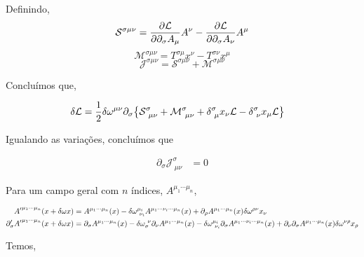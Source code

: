 \documentclass[twoside]{amsart}
\numberwithin{equation}{section}
\begin{document}
Definindo,$$\mathcal S^{\sigma\mu\nu}=\pdv{\mathcal L}{\partial_\sigma A_\mu}A^\nu-\pdv{\mathcal L}{\partial_\sigma A_\nu}A^\mu$$ $$\mathcal M^{\sigma\mu\nu}=T^{\sigma\mu}x^\nu-T^{\sigma\nu}x^\mu$$ $$\mathcal J^{\sigma\mu\nu}=\mathcal S^{\sigma\mu\nu}+\mathcal M^{\sigma\mu\nu}$$

Concluímos que,

\begin{align}
    \delta\mathcal L&=\frac12\delta\omega^{\mu\nu}\partial_\sigma\qty{\mathcal S^{\sigma}_{\ \mu\nu}+\mathcal M^{\sigma}_{\ \mu\nu}+\delta^\sigma_{\ \mu}x_\nu\mathcal L-\delta^\sigma_{\ \nu}x_\mu\mathcal L}
\end{align}

Igualando as variações, concluímos que 

\begin{align}
    \partial_\sigma\mathcal J^{\sigma}_{\ \mu\nu}&=0
\end{align}

Para um campo geral com $n$ índices, $A^{\mu_1\cdots\mu_n}$,

\begin{align}
    {A'}^{\mu_1\cdots\mu_n}\qty(x+\delta \omega x)&=A^{\mu_1\cdots\mu_n}\qty(x)-\delta\omega^{\mu_i}_{\ \nu_i}A^{\mu_1\cdots\nu_i\cdots\mu_n}\qty(x)+\partial_\rho A^{\mu_1\cdots\mu_n}\qty(x)\delta\omega^{\rho \nu}x_\nu\\
    \partial_\sigma'{A'}^{\mu_1\cdots\mu_n}\qty(x+\delta\omega x)&=\partial_\sigma A^{\mu_1\cdots\mu_n}\qty(x)-\delta\omega_{\sigma}^{\ \nu}\partial_\nu A^{\mu_1\cdots\mu_n}\qty(x)-\delta\omega^{\mu_i}_{\ \nu_i}\partial_\sigma A^{\mu_1\cdots\nu_i\cdots\mu_n}\qty(x)+\partial_\nu\partial_\sigma A^{\mu_1\cdots\mu_n}\qty(x)\delta\omega^{\nu\rho}x_\rho
\end{align}

Temos,
\end{document}
